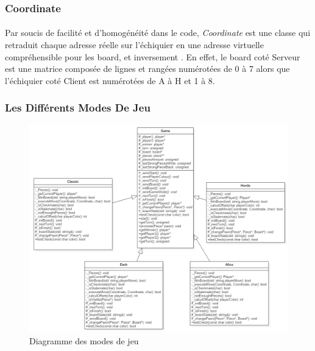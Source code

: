 \documentclass[10pt, a4paper]{article}
\begin{document}
\subsubsection{Coordinate}
\paragraph{}Par soucis de facilité et d'homogénéité dans le code, \textit{Coordinate} est une classe qui retraduit chaque adresse réelle sur l'échiquier en une adresse virtuelle compréhensible pour les board, et inversement . En effet, le board coté Serveur est une matrice composée de lignes et rangées numérotées de 0 à 7 alors que l'échiquier coté Client est numérotées de A à H et 1 à 8.

\subsubsection{Les Différents Modes De Jeu}
\begin{figure}[H]
\centering
\includegraphics[scale=0.5]{mode_chess.png}
\caption{Diagramme des modes de jeu}
\label{CD} %
\end{figure}
\end{document}
